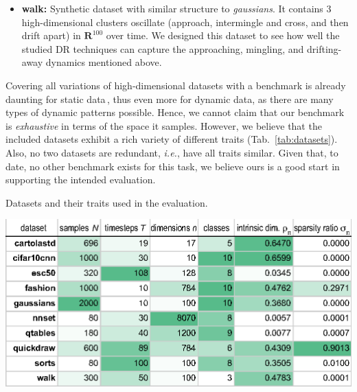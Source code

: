 \begin{itemize}
  \item \textbf{walk:} Synthetic dataset with similar structure to \emph{gaussians}. It contains 3 high-dimensional clusters oscillate (approach, intermingle and cross, and then drift apart) in $\mathbf{R}^{100}$ over time. We designed this dataset to see how well the studied DR techniques can capture the approaching, mingling, and drifting-away dynamics mentioned above.
\end{itemize}



Covering all variations of high-dimensional datasets with a benchmark is already daunting for static data\,\cite{EspadotoSurvey}, thus even more for dynamic data, as there are many types of dynamic patterns possible. Hence, we cannot claim that our benchmark is \emph{exhaustive} in terms of the space it samples. However, we believe that the included datasets exhibit a rich variety of different traits (Tab.~\ref{tab:datasets}). Also, no two datasets are redundant, \emph{i.e.}, have all traits similar. Given that, to date, no other benchmark exists for this task, we believe ours is a good start in supporting the intended evaluation.

\begin{table}
\centering
\caption{Datasets and their traits used in the evaluation.}
\label{tab:datasets}
\vspace{-0.15cm}
\includegraphics[width=.99\linewidth]{figures/projection-evaluation/datasets.eps}
\vspace{-0.15cm}
\end{table}

